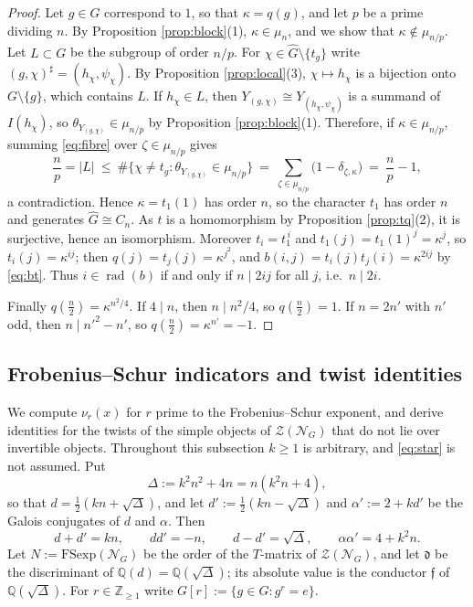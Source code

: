 \documentclass[10pt]{article}
\theoremstyle{plain}
\theoremstyle{definition}
\theoremstyle{plain}
\begin{document}
\begin{proof}
Let $g\in G$ correspond to $1$, so that $\kappa=q(g)$, and let $p$ be a prime dividing $n$. By Proposition \ref{prop:block}(1), $\kappa\in\mu_n$, and we show that $\kappa\notin\mu_{n/p}$. Let $L\subset G$ be the subgroup of order $n/p$. For $\chi\in\widehat{G}\setminus\{t_g\}$ write $(g,\chi)^\sharp=(h_\chi,\psi_\chi)$. By Proposition \ref{prop:local}(3), $\chi\mapsto h_\chi$ is a bijection onto $G\setminus\{g\}$, which contains $L$. If $h_\chi\in L$, then $Y_{(g,\chi)}\cong Y_{(h_\chi,\psi_\chi)}$ is a summand of $I(h_\chi)$, so $\theta_{Y_{(g,\chi)}}\in\mu_{n/p}$ by Proposition \ref{prop:block}(1). Therefore, if $\kappa\in\mu_{n/p}$, summing \eqref{eq:fibre} over $\zeta\in\mu_{n/p}$ gives
\[
  \frac np=|L|\ \le\ \#\bigl\{\chi\neq t_g:\theta_{Y_{(g,\chi)}}\in\mu_{n/p}\bigr\}
  \ =\ \sum_{\zeta\in\mu_{n/p}}\bigl(1-\delta_{\zeta,\kappa}\bigr)\ =\ \frac np-1,
\]
a contradiction. Hence $\kappa=t_1(1)$ has order $n$, so the character $t_1$ has order $n$ and generates $\widehat{G}\cong C_n$. As $t$ is a homomorphism by Proposition \ref{prop:tq}(2), it is surjective, hence an isomorphism. Moreover $t_i=t_1^{\,i}$ and $t_1(j)=t_1(1)^j=\kappa^j$, so $t_i(j)=\kappa^{ij}$; then $q(j)=t_j(j)=\kappa^{j^2}$, and $b(i,j)=t_i(j)t_j(i)=\kappa^{2ij}$ by \eqref{eq:bt}. Thus $i\in\operatorname{rad}(b)$ if and only if $n\mid 2ij$ for all $j$, i.e.\ $n\mid 2i$.
 
Finally $q(\tfrac n2)=\kappa^{n^2/4}$. If $4\mid n$, then $n\mid n^2/4$, so $q(\tfrac n2)=1$. If $n=2n'$ with $n'$ odd, then $n\mid n'^2-n'$, so $q(\tfrac n2)=\kappa^{n'}=-1$.
\end{proof}

\subsection{Frobenius--Schur indicators and twist identities}\label{subsec:indicators}

We compute $\nu_r(x)$ for $r$ prime to the Frobenius--Schur exponent, and derive identities for the twists of the simple objects of $\mathcal{Z}(\mathcal{N}_G)$ that do not lie over invertible objects. Throughout this subsection $k\geq1$ is arbitrary, and \eqref{eq:star} is not assumed. Put
\[
\Delta:=k^2n^2+4n=n(k^2n+4),
\]
so that $d=\frac12(kn+\sqrt\Delta)$, and let $d':=\frac12(kn-\sqrt\Delta)$ and $\alpha':=2+kd'$ be the Galois conjugates of $d$ and $\alpha$. Then
\begin{equation}\label{eq:ddprime}
  d+d'=kn,\qquad dd'=-n,\qquad d-d'=\sqrt\Delta,\qquad \alpha\alpha'=4+k^2n .
\end{equation}
Let $N:=\mathrm{FSexp}(\mathcal{N}_G)$ be the order of the $T$-matrix of $\mathcal{Z}(\mathcal{N}_G)$, and let $\mathfrak{d}$ be the discriminant of $\mathbb{Q}(d)=\mathbb{Q}(\sqrt\Delta)$; its absolute value is the conductor $\mathfrak{f}$ of $\mathbb{Q}(\sqrt\Delta)$. For $r\in\mathbb{Z}_{\geq1}$ write $G[r]:=\{g\in G:g^r=e\}$.
\end{document}
